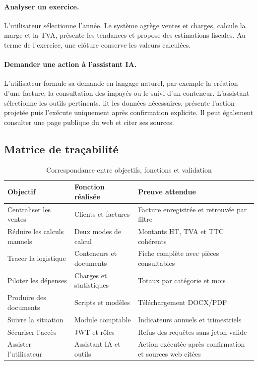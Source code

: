 \documentclass[12pt,a4paper,oneside]{report}
\begin{document}
\paragraph{Analyser un exercice.}
L'utilisateur sélectionne l'année. Le système agrège ventes et charges, calcule la marge et la TVA, présente les tendances et propose des estimations fiscales. Au terme de l'exercice, une clôture conserve les valeurs calculées.

\paragraph{Demander une action à l'assistant IA.}
L'utilisateur formule sa demande en langage naturel, par exemple la création d'une facture, la consultation des impayés ou le suivi d'un conteneur. L'assistant sélectionne les outils pertinents, lit les données nécessaires, présente l'action projetée puis l'exécute uniquement après confirmation explicite. Il peut également consulter une page publique du web et citer ses sources.

\subsection{Matrice de traçabilité}
\begin{table}[H]\centering
\caption{Correspondance entre objectifs, fonctions et validation}
\begin{tabularx}{\textwidth}{p{3.3cm}Y Y}
\toprule \textbf{Objectif} & \textbf{Fonction réalisée} & \textbf{Preuve attendue}\\ \midrule
Centraliser les ventes & Clients et factures & Facture enregistrée et retrouvée par filtre\\
Réduire les calculs manuels & Deux modes de calcul & Montants HT, TVA et TTC cohérents\\
Tracer la logistique & Conteneurs et documents & Fiche complète avec pièces consultables\\
Piloter les dépenses & Charges et statistiques & Totaux par catégorie et mois\\
Produire des documents & Scripts et modèles & Téléchargement DOCX/PDF\\
Suivre la situation & Module comptable & Indicateurs annuels et trimestriels\\
Sécuriser l'accès & JWT et rôles & Refus des requêtes sans jeton valide\\
Assister l'utilisateur & Assistant IA et outils & Action exécutée après confirmation et sources web citées\\
\bottomrule
\end{tabularx}
\end{table}
\end{document}
